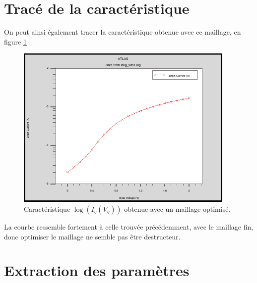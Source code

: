 \documentclass[a4paper,11pt]{report}
\begin{document}
\noindent{}
\vspace{0.3cm}

\section{Tracé de la caractéristique}

On peut ainsi également tracer la caractéristique obtenue avec ce maillage, en figure \ref{logIdVgmeshopti}

\begin{figure}[H]
    \centering
    \includegraphics[width=300pt]{../meshOpti1/Log.png}
    \caption{Caractéristique $\log(I_g(V_g))$ obtenue avec un maillage optimisé.}
    \label{logIdVgmeshopti}
\end{figure}
 La courbe ressemble fortement à celle trouvée précédemment, avec le maillage fin, donc optimiser le maillage ne semble pas être destructeur.

\section{Extraction des paramètres}
\end{document}

